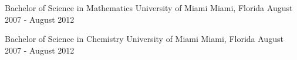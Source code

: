 

\begin{cventries}

  \cventry
    {Bachelor of Science in Mathematics} %
    {University of Miami} %
    {Miami, Florida} %
    {August 2007 - August 2012} %
    {}

  \cventry
    {Bachelor of Science in Chemistry} %
    {University of Miami} %
    {Miami, Florida} %
    {August 2007 - August 2012} %
    {}

\end{cventries}
